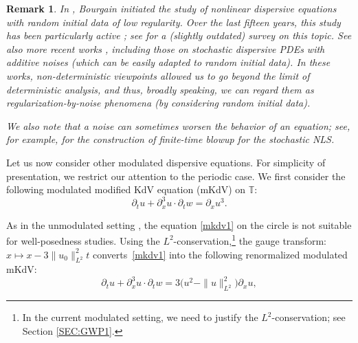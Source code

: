 \documentclass[letterpaper, 11pt,  reqno]{amsart}
\newtheorem{remark}[theorem]{Remark}
\newcommand{\1}{\hspace{0.5mm}\text{I}\hspace{0.5mm}}
\newcommand{\noi}{\noindent}
\newcommand{\T}{\mathbb{T}}
\newcommand{\dx}{\partial_x}
\newcommand{\dt}{\partial_t}
\numberwithin{equation}{section}
\numberwithin{theorem}{section}
\begin{document}
\begin{remark}\label{REM:random1}
\rm
In \cite{BO94, BO96}, Bourgain initiated the study 
of nonlinear dispersive equations with random initial data of low regularity.
Over the last fifteen years, 
this study has been particularly active
\cite{BO96, BT08, CO, BT3, BOP2, Poc, OP};
see \cite{BOP4} for a (slightly outdated) survey on this topic.
See also more recent works
\cite{GKO2, DNY2, OOT1, Bring, OOT2, BDNY}, including those
on stochastic dispersive PDEs with additive noises
(which can be easily adapted to random initial data).
In these works, 
non-deterministic viewpoints
allowed us to go beyond the limit of deterministic analysis, 
and thus, 
broadly speaking, 
we can  regard them as 
regularization-by-noise phenomena
(by considering random initial data). 




We also note that 
a  noise can sometimes  worsen the behavior of an equation; 
see, 
for example, 
\cite{de_bouard_effect_2002, de_bouard_blow-up_2005}
for the construction of 
finite-time blowup  for the stochastic NLS.



\end{remark}














\medskip



Let us now consider other modulated dispersive equations.
For simplicity of presentation, 
we restrict our attention to the periodic case.
We first consider the following
  modulated
 modified KdV equation (mKdV) on $\T$:
\begin{equation}
\label{mkdv1}
\dt u+ \dx^3 u \cdot \dt w=\dx u^3.
\end{equation}



\noi
As in the unmodulated setting \cite{BO93}, 
the equation \eqref{mkdv1} on the circle is not suitable 
for well-posedness studies.
Using the $L^2$-conservation,\footnote{In the current modulated setting, 
we need to justify the $L^2$-conservation; see Section \ref{SEC:GWP1}.} 
the gauge transform: $x \mapsto x -3\|u_0\|_{L^2}^2 t$
converts~\eqref{mkdv1}
into the  following renormalized modulated mKdV:
\begin{equation}
\label{mkdv2}
\dt u+   \dx^3 u \cdot \dt w=3   \big(u^2- \|u\|_{L^2}^2\big)\dx u, 
\end{equation}
\end{document}
